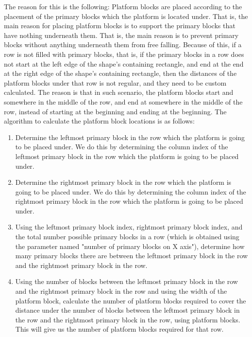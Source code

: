 \documentclass[12pt]{dalthesis}
\begin{document}
\begin{enumerate}
\begin{enumerate}
    The reason for this is the following: Platform blocks are placed according to the placement of the primary blocks which the platform is located under. That is, the main reason for placing platform blocks is to support the primary blocks that have nothing underneath them. That is, the main reason is to prevent primary blocks without anything underneath them from free falling. Because of this, if a row is not filled with primary blocks, that is, if the primary blocks in a row does not start at the left edge of the shape's containing rectangle, and end at the end at the right edge of the shape's containing rectangle, then the distances of the platform blocks under that row is not regular, and they need to be custom calculated. The reason is that in such scenario, the platform blocks start and somewhere in the middle of the row, and end at somewhere in the middle of the row, instead of starting at the beginning and ending at the beginning. The algorithm to calculate the platform block locations is as follows:

    \begin{enumerate}
      \item Determine the leftmost primary block in the row which the platform is going to be placed under. We do this by determining the column index of the leftmost primary block in the row which the platform is going to be placed under.

      \item Determine the rightmost primary block in the row which the platform is going to be placed under. We do this by determining the column index of the rightmost primary block in the row which the platform is going to be placed under.

      \item Using the leftmost primary block index, rightmost primary block index, and the total number possible primary blocks in a row (which is obtained using the parameter named "number of primary blocks on X axis"), determine how many primary blocks there are between the leftmost primary block in the row and the rightmost primary block in the row.

      \item Using the number of blocks between the leftmost primary block in the row and the rightmost primary block in the row and using the width of the platform block, calculate the number of platform blocks required to cover the distance under the number of blocks between the leftmost primary block in the row and the rightmost primary block in the row, using platform blocks. This will give us the number of platform blocks required for that row.


\end{enumerate}
\end{enumerate}
\end{enumerate}
\end{document}
